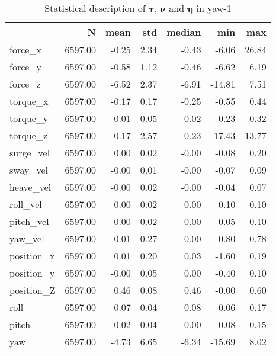 \begin{table}[hb]
\centering
\caption{Statistical description of $\boldsymbol{\tau}$, $\boldsymbol{\nu}$ and $\boldsymbol{\eta}$ in yaw-1}
\label{tab:description-yaw-1}
\begin{tabular}{lrrrrrr}
\toprule
{} &       N &  mean &  std & median &    min &   max \\
\midrule
force\_x    & 6597.00 & -0.25 & 2.34 &  -0.43 &  -6.06 & 26.84 \\
force\_y    & 6597.00 & -0.58 & 1.12 &  -0.46 &  -6.62 &  6.19 \\
force\_z    & 6597.00 & -6.52 & 2.37 &  -6.91 & -14.81 &  7.51 \\
torque\_x   & 6597.00 & -0.17 & 0.17 &  -0.25 &  -0.55 &  0.44 \\
torque\_y   & 6597.00 & -0.01 & 0.05 &  -0.02 &  -0.23 &  0.32 \\
torque\_z   & 6597.00 &  0.17 & 2.57 &   0.23 & -17.43 & 13.77 \\
surge\_vel  & 6597.00 &  0.00 & 0.02 &  -0.00 &  -0.08 &  0.20 \\
sway\_vel   & 6597.00 & -0.00 & 0.01 &  -0.00 &  -0.07 &  0.09 \\
heave\_vel  & 6597.00 & -0.00 & 0.02 &  -0.00 &  -0.04 &  0.07 \\
roll\_vel   & 6597.00 & -0.00 & 0.02 &  -0.00 &  -0.10 &  0.10 \\
pitch\_vel  & 6597.00 &  0.00 & 0.02 &   0.00 &  -0.05 &  0.10 \\
yaw\_vel    & 6597.00 & -0.01 & 0.27 &   0.00 &  -0.80 &  0.78 \\
position\_x & 6597.00 &  0.01 & 0.20 &   0.03 &  -1.60 &  0.19 \\
position\_y & 6597.00 & -0.00 & 0.05 &   0.00 &  -0.40 &  0.10 \\
position\_Z & 6597.00 &  0.46 & 0.08 &   0.46 &  -0.00 &  0.60 \\
roll       & 6597.00 &  0.07 & 0.04 &   0.08 &  -0.06 &  0.17 \\
pitch      & 6597.00 &  0.02 & 0.04 &   0.00 &  -0.08 &  0.15 \\
yaw        & 6597.00 & -4.73 & 6.65 &  -6.34 & -15.69 &  8.02 \\
\bottomrule
\end{tabular}
\end{table}
